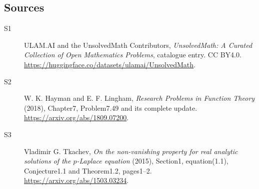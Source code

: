 \documentclass[11pt]{article}
\begin{document}
\subsection{Sources}
\begin{description}
\item[\hypertarget{source:statement:1}{S1}] ULAM.AI and the UnsolvedMath Contributors, \emph{UnsolvedMath: A Curated Collection of Open Mathematics Problems}, catalogue entry. CC BY4.0. \url{https://huggingface.co/datasets/ulamai/UnsolvedMath}.
\item[\hypertarget{source:statement:2}{S2}] W. K. Hayman and E. F. Lingham, \emph{Research Problems in Function Theory} (2018), Chapter7, Problem7.49 and its complete update. \url{https://arxiv.org/abs/1809.07200}.
\item[\hypertarget{source:statement:3}{S3}] Vladimir G. Tkachev, \emph{On the non-vanishing property for real analytic solutions of the $p$-Laplace equation} (2015), Section1, equation(1.1), Conjecture1.1 and Theorem1.2, pages1--2. \url{https://arxiv.org/abs/1503.03234}.
\end{description}
\label{end:statement}
\end{document}
